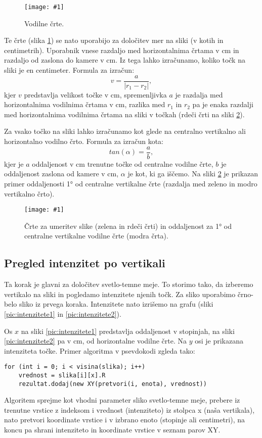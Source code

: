 \documentclass[oneside, a4paper, 12pt]{book}
\newcommand{\slika}[3]{
	\begin{figure}
	\begin{center}
	\texttt{[image: \#1]}
	\end{center}
	\vspace{-20pt}
	\caption{#2}
	\label{#3}
	\end{figure}
}
\begin{document}
\slika{slike/vodilne-crte.jpg}{Vodilne črte.}{pic:vodilne-crte}

Te črte (slika \ref{pic:vodilne-crte}) se nato uporabijo za določitev mer na sliki (v kotih in centimetrih). Uporabnik vnese razdaljo med horizontalnima črtama v cm in razdaljo od zaslona do kamere v cm. Iz tega lahko izračunamo, koliko točk na sliki je en centimeter. Formula za izračun:
\begin{equation}
v=\dfrac{a}{|r_1-r_2|},
\end{equation}
kjer $v$ predstavlja velikost točke v cm, spremenljivka $a$ je razdalja med horizontalnima vodilnima črtama v cm, razlika med $r_1$ in $r_2$ pa je enaka razdalji med horizontalnima vodilnima črtama na sliki v točkah (rdeči črti na sliki \ref{pic:vodilne-mere}). 

Za vsako točko na sliki lahko izračunamo kot glede na centralno vertikalno ali horizontalno vodilno črto. Formula za izračun kota:
\begin{equation}
tan(\alpha)=\dfrac{a}{b},
\end{equation}
kjer je $a$ oddaljenost v cm trenutne točke od centralne vodilne črte, $b$ je oddaljenost zaslona od kamere v cm, $\alpha$ je kot, ki ga iščemo. Na sliki \ref{pic:vodilne-mere} je prikazan primer oddaljenosti 1° od centralne vertikalne črte (razdalja med zeleno in modro vertikalno črto).

\slika{slike/vodilne-mere.jpg}{Črte za umeritev slike (zelena in rdeči črti) in oddaljenost za 1° od centralne vertikalne vodilne črte (modra črta).}{pic:vodilne-mere}

\subsection{Pregled intenzitet po vertikali}
Ta korak je glavni za določitev svetlo-temne meje. To storimo tako, da izberemo vertikalo na sliki in pogledamo intenzitete njenih točk. Za sliko uporabimo črno-belo sliko iz prvega koraka. Intenzitete nato izrišemo na grafu (sliki \ref{pic:intenzitete1} in \ref{pic:intenzitete2}).

Os $x$ na sliki \ref{pic:intenzitete1} predstavlja oddaljenost v stopinjah, na sliki \ref{pic:intenzitete2} pa v cm, od horizontalne vodilne črte. Na $y$ osi je prikazana intenziteta točke. Primer algoritma v psevdokodi zgleda tako:
\begin{samepage}
\begin{verbatim}
for (int i = 0; i < visina(slika); i++)
    vrednost = slika[i][x].R
    rezultat.dodaj(new XY(pretvori(i, enota), vrednost))
\end{verbatim}
\end{samepage}
Algoritem sprejme kot vhodni parameter sliko svetlo-temne meje, prebere iz trenutne vrstice z indeksom i vrednost (intenziteto) iz stolpca x (naša vertikala), nato pretvori koordinate vrstice i v izbrano enoto (stopinje ali centimetri), na koncu pa shrani intenziteto in koordinate vrstice v seznam parov XY.
\end{document}
